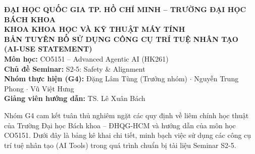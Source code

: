 \documentclass[11pt,a4paper]{article}
\begin{document}

\begin{center}
  {\small \textbf{ĐẠI HỌC QUỐC GIA TP. HỒ CHÍ MINH -- TRƯỜNG ĐẠI HỌC BÁCH KHOA}}\\[0.05cm]
  {\small \textbf{KHOA KHOA HỌC VÀ KỸ THUẬT MÁY TÍNH}}\\[0.1cm]
  {\large\bfseries\color{hcmutblue} BẢN TUYÊN BỐ SỬ DỤNG CÔNG CỤ TRÍ TUỆ NHÂN TẠO}\\[0.05cm]
  {\large\bfseries\color{hcmutblue} (AI-USE STATEMENT)}\\[0.2cm]
  {\normalsize \textbf{Môn học:} CO5151 -- Advanced Agentic AI (HK261)}\\
  {\normalsize \textbf{Chủ đề Seminar:} S2-5: Safety \& Alignment}\\
  {\normalsize \textbf{Nhóm thực hiện (G4):} Đặng Lâm Tùng (Trưởng nhóm) $\cdot$ Nguyễn Trung Phong $\cdot$ Vũ Việt Hưng}\\
  {\normalsize \textbf{Giảng viên hướng dẫn:} TS. Lê Xuân Bách}
\end{center}

\vspace{0.4cm}
\noindent Nhóm G4 cam kết tuân thủ nghiêm ngặt các quy định về liêm chính học thuật của Trường Đại học Bách khoa -- ĐHQG-HCM và hướng dẫn của môn học CO5151. Dưới đây là bảng kê khai chi tiết, minh bạch việc sử dụng các công cụ trí tuệ nhân tạo (AI Tools) trong quá trình chuẩn bị tài liệu Seminar S2-5.

\vspace{0.3cm}
\end{document}
